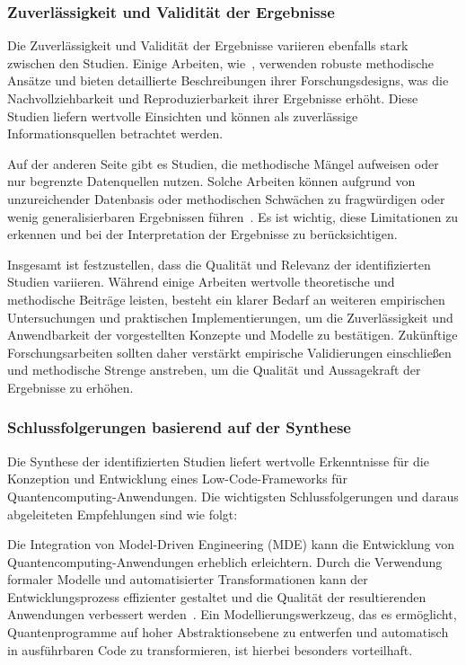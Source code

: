 \subsubsection{Zuverlässigkeit und Validität der Ergebnisse}
Die Zuverlässigkeit und Validität der Ergebnisse variieren ebenfalls stark zwischen den Studien. Einige 
Arbeiten, wie~\cite{Ahmad_2023}, verwenden robuste methodische Ansätze und bieten detaillierte Beschreibungen 
ihrer Forschungsdesigns, was die Nachvollziehbarkeit und Reproduzierbarkeit ihrer Ergebnisse erhöht. Diese Studien 
liefern wertvolle Einsichten und können als zuverlässige Informationsquellen betrachtet werden.

Auf der anderen Seite gibt es Studien, die methodische Mängel aufweisen oder nur begrenzte Datenquellen nutzen. Solche 
Arbeiten können aufgrund von unzureichender Datenbasis oder methodischen Schwächen zu fragwürdigen oder wenig 
generalisierbaren Ergebnissen führen~\cite{Khorram_2020}. Es ist wichtig, diese Limitationen zu erkennen und bei 
der Interpretation der Ergebnisse zu berücksichtigen.

Insgesamt ist festzustellen, dass die Qualität und Relevanz der identifizierten Studien variieren. Während einige 
Arbeiten wertvolle theoretische und methodische Beiträge leisten, besteht ein klarer Bedarf an weiteren empirischen 
Untersuchungen und praktischen Implementierungen, um die Zuverlässigkeit und Anwendbarkeit der vorgestellten Konzepte 
und Modelle zu bestätigen. Zukünftige Forschungsarbeiten sollten daher verstärkt empirische Validierungen einschließen 
und methodische Strenge anstreben, um die Qualität und Aussagekraft der Ergebnisse zu erhöhen. 

\subsubsection{Schlussfolgerungen basierend auf der Synthese}

Die Synthese der identifizierten Studien liefert wertvolle Erkenntnisse für die Konzeption und Entwicklung eines Low-Code-Frameworks 
für Quantencomputing-Anwendungen. Die wichtigsten Schlussfolgerungen und daraus abgeleiteten Empfehlungen sind wie folgt:

Die Integration von Model-Driven Engineering (MDE) kann die Entwicklung von Quantencomputing-Anwendungen erheblich erleichtern. 
Durch die Verwendung formaler Modelle und automatisierter Transformationen kann der Entwicklungsprozess effizienter gestaltet 
und die Qualität der resultierenden Anwendungen verbessert werden~\cite{France_2007, Selic_2003}. Ein Modellierungswerkzeug, 
das es ermöglicht, Quantenprogramme auf hoher Abstraktionsebene zu entwerfen und automatisch in ausführbaren Code zu transformieren, 
ist hierbei besonders vorteilhaft.

